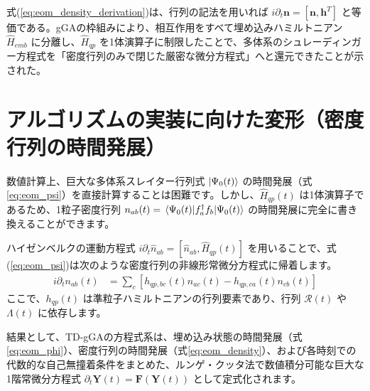 \documentclass[a4paper,11pt]{ltjarticle}
\begin{document}
式(\ref{eq:eom_density_derivation})は、行列の記法を用いれば $i\partial_t \bm{n} = [\bm{n}, \bm{h}^T]$ と等価である。gGAの枠組みにより、相互作用をすべて埋め込みハミルトニアン $\hat{H}_{emb}$ に分離し、$\hat{H}_{qp}$ を1体演算子に制限したことで、多体系のシュレーディンガー方程式を「密度行列のみで閉じた厳密な微分方程式」へと還元できたことが示された。

\section{アルゴリズムの実装に向けた変形（密度行列の時間発展）}
数値計算上、巨大な多体系スレイター行列式 $\ket{\Psi_0(t)}$ の時間発展（式\ref{eq:eom_psi}）を直接計算することは困難です。しかし、$\hat{H}_{qp}(t)$ は1体演算子であるため、1粒子密度行列 $n_{ab}(t) = \mel{\Psi_0(t)}{f_a^\dagger f_b}{\Psi_0(t)}$ の時間発展に完全に書き換えることができます。

ハイゼンベルクの運動方程式 $i\partial_t \hat{n}_{ab} = [\hat{n}_{ab}, \hat{H}_{qp}(t)]$ を用いることで、式(\ref{eq:eom_psi})は次のような密度行列の非線形常微分方程式に帰着します。
\begin{align}
i\partial_t n_{ab}(t) &= \sum_c \left[ h_{qp, bc}(t) n_{ac}(t) - h_{qp, ca}(t) n_{cb}(t) \right]
\label{eq:eom_density}
\end{align}
ここで、$h_{qp}(t)$ は準粒子ハミルトニアンの行列要素であり、行列 $\mathcal{R}(t)$ や $\Lambda(t)$ に依存します。

結果として、TD-gGAの方程式系は、埋め込み状態の時間発展（式\ref{eq:eom_phi}）、密度行列の時間発展（式\ref{eq:eom_density}）、および各時刻での代数的な自己無撞着条件をまとめた、ルンゲ・クッタ法で数値積分可能な巨大な1階常微分方程式 $\partial_t \bm{Y}(t) = \bm{F}(\bm{Y}(t))$ として定式化されます。
\end{document}
